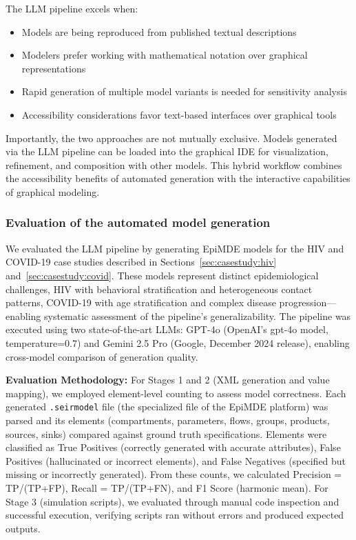 The LLM pipeline excels when:
\begin{itemize}
    \item Models are being reproduced from published textual descriptions
    \item Modelers prefer working with mathematical notation over graphical representations
    \item Rapid generation of multiple model variants is needed for sensitivity analysis
    \item Accessibility considerations favor text-based interfaces over graphical tools
\end{itemize}

Importantly, the two approaches are not mutually exclusive. Models generated via the LLM pipeline can be loaded into the graphical IDE for visualization, refinement, and composition with other models. This hybrid workflow combines the accessibility benefits of automated generation with the interactive capabilities of graphical modeling.

\subsubsection{Evaluation of the automated model generation}

We evaluated the LLM pipeline by generating EpiMDE models for the HIV and COVID-19 case studies described in Sections~\ref{sec:casestudy:hiv} and~\ref{sec:casestudy:covid}. These models represent distinct epidemiological challenges, HIV with behavioral stratification and heterogeneous contact patterns, COVID-19 with age stratification and complex disease progression—enabling systematic assessment of the pipeline's generalizability. The pipeline was executed using two state-of-the-art LLMs: GPT-4o (OpenAI's gpt-4o model, temperature=0.7) and Gemini 2.5 Pro (Google, December 2024 release), enabling cross-model comparison of generation quality.

\textbf{Evaluation Methodology:} For Stages 1 and 2 (XML generation and value mapping), we employed element-level counting to assess model correctness. Each generated \texttt{.seirmodel} file (the specialized file of the EpiMDE platform) was parsed and its elements (compartments, parameters, flows, groups, products, sources, sinks) compared against ground truth specifications. Elements were classified as True Positives (correctly generated with accurate attributes), False Positives (hallucinated or incorrect elements), and False Negatives (specified but missing or incorrectly generated). From these counts, we calculated Precision = TP/(TP+FP), Recall = TP/(TP+FN), and F1 Score (harmonic mean). For Stage 3 (simulation scripts), we evaluated through manual code inspection and successful execution, verifying scripts ran without errors and produced expected outputs.